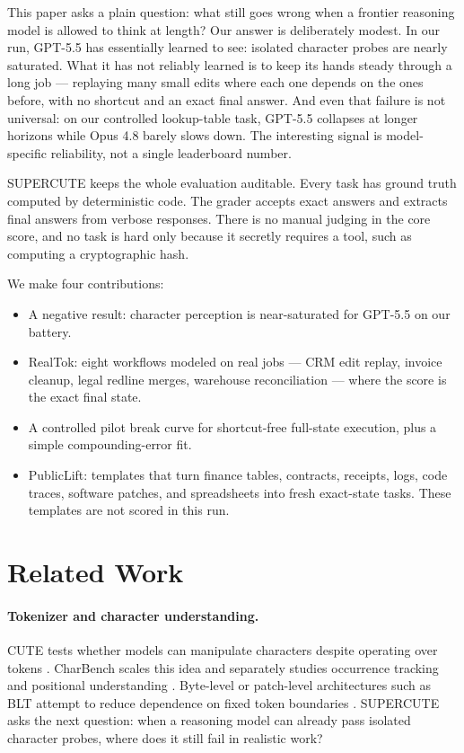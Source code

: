 \documentclass[10pt,twocolumn]{article}
\begin{document}
This paper asks a plain question: what still goes wrong when a frontier reasoning model is allowed to think at length? Our answer is deliberately modest. In our run, GPT-5.5 has essentially learned to see: isolated character probes are nearly saturated. What it has not reliably learned is to keep its hands steady through a long job --- replaying many small edits where each one depends on the ones before, with no shortcut and an exact final answer. And even that failure is not universal: on our controlled lookup-table task, GPT-5.5 collapses at longer horizons while Opus 4.8 barely slows down. The interesting signal is model-specific reliability, not a single leaderboard number.

SUPERCUTE keeps the whole evaluation auditable. Every task has ground truth computed by deterministic code. The grader accepts exact answers and extracts final answers from verbose responses. There is no manual judging in the core score, and no task is hard only because it secretly requires a tool, such as computing a cryptographic hash.

We make four contributions:
\begin{itemize}
  \item A negative result: character perception is near-saturated for GPT-5.5 on our battery.
  \item RealTok: eight workflows modeled on real jobs --- CRM edit replay, invoice cleanup, legal redline merges, warehouse reconciliation --- where the score is the exact final state.
  \item A controlled pilot break curve for shortcut-free full-state execution, plus a simple compounding-error fit.
  \item PublicLift: templates that turn finance tables, contracts, receipts, logs, code traces, software patches, and spreadsheets into fresh exact-state tasks. These templates are not scored in this run.
\end{itemize}

\section{Related Work}
\paragraph{Tokenizer and character understanding.}
CUTE tests whether models can manipulate characters despite operating over tokens \citep{edman2024cute}. CharBench scales this idea and separately studies occurrence tracking and positional understanding \citep{uzan2026charbench}. Byte-level or patch-level architectures such as BLT attempt to reduce dependence on fixed token boundaries \citep{pagnoni2024blt}. SUPERCUTE asks the next question: when a reasoning model can already pass isolated character probes, where does it still fail in realistic work?
\end{document}
